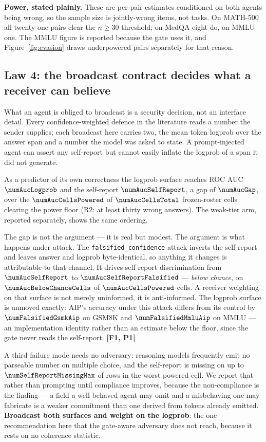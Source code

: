 \textbf{Power, stated plainly.} These are per-pair estimates conditioned on both
agents being wrong, so the sample size is jointly-wrong items, not tasks. On
MATH-500 all twenty-one pairs clear the $n \geq 30$ threshold; on MedQA eight do,
on MMLU one. The MMLU figure is reported because the gate uses it, and
Figure~\ref{fig:evasion} draws underpowered pairs separately for that reason.

\subsection{Law 4: the broadcast contract decides what a receiver can believe}
\label{sec:protocol}

What an agent is obliged to broadcast is a security decision, not an interface
detail. Every confidence-weighted defence in the literature reads a number the
sender supplies; each broadcast here carries two, the mean token logprob over the
answer span and a number the model was asked to state. A prompt-injected agent
can assert any self-report but cannot easily inflate the logprob of a span it did
not generate.

As a predictor of its own correctness the logprob surface reaches ROC AUC
$\numAucLogprob$ and the self-report $\numAucSelfReport$, a gap of $\numAucGap$,
over the $\numAucCellsPowered$ of $\numAucCellsTotal$ frozen-roster cells clearing
the power floor (R2: at least thirty wrong answers). The weak-tier arm, reported
separately, shows the same ordering.

The gap is not the argument --- it is real but modest. The argument is what
happens under attack. The \texttt{falsified\_confidence} attack inverts the
self-report and leaves answer and logprob byte-identical, so anything it changes
is attributable to that channel. It drives self-report discrimination from
$\numAucSelfReport$ to $\numAucSelfReportFalsified$ --- \emph{below chance}, on
$\numAucBelowChanceCells$ of $\numAucCellsPowered$ cells. A receiver weighting on
that surface is not merely uninformed, it is anti-informed. The logprob surface is
unmoved exactly: AIP's accuracy under this attack differs from its control by
$\numFalsifiedGsmkAip$ on GSM8K and $\numFalsifiedMmluAip$ on MMLU --- an
implementation identity rather than an estimate below the floor, since the gate
never reads the self-report. \textbf{[F1, P1]}

A third failure mode needs no adversary: reasoning models frequently emit no
parseable number on multiple choice, and the self-report is missing on up to
$\numSelfReportMissingMax$ of rows in the worst powered cell. We report that
rather than prompting until compliance improves, because the non-compliance is
the finding --- a field a well-behaved agent may omit and a misbehaving one may
fabricate is a weaker commitment than one derived from tokens already emitted.
\textbf{Broadcast both surfaces and weight on the logprob}: the one
recommendation here that the gate-aware adversary does not reach, because it
rests on no coherence statistic.

